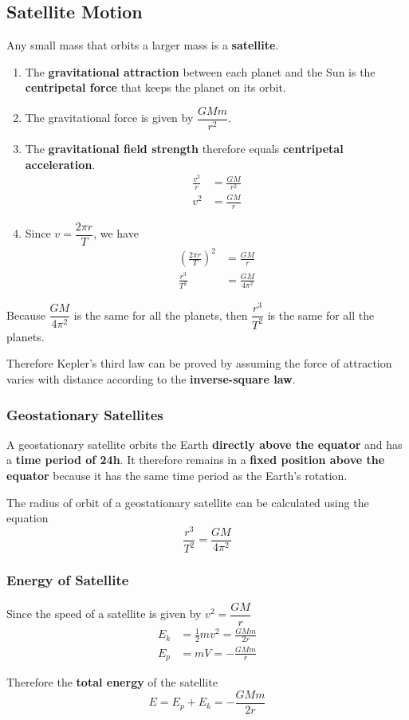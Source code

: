 \subsection{Satellite Motion}

Any small mass that orbits a larger mass is a \textbf{satellite}.

\begin{enumerate}
    \item The \textbf{gravitational attraction} between each planet and the Sun is the \textbf{centripetal force} that keeps the planet on its orbit.
    \item The gravitational force is given by $\dfrac{GMm}{r^2}$.
    \item The \textbf{gravitational field strength} therefore equals \textbf{centripetal acceleration}.
        \begin{align*}
            \frac{v^2}{r}&=\frac{GM}{r^2}\\
            v^2&=\frac{GM}{r}
        \end{align*}
    \item Since $v=\dfrac{2\pi r}{T}$, we have
        \begin{align*}
            \left(\frac{2\pi r}{T}\right)^2&=\frac{GM}{r}\\
            \frac{r^3}{T^2}&=\frac{GM}{4\pi^2}
        \end{align*}
\end{enumerate}
Because $\dfrac{GM}{4\pi^2}$ is the same for all the planets, then $\dfrac{r^3}{T^2}$ is the same for all the planets.

Therefore Kepler's third law can be proved by assuming the force of attraction varies with distance according to the \textbf{inverse-square law}.

\subsubsection*{Geostationary Satellites}

A geostationary satellite orbits the Earth \textbf{directly above the equator} and has a \textbf{time period of 24h}. It therefore remains in a \textbf{fixed position above the equator} because it has the same time period as the Earth's rotation.

The radius of orbit of a geostationary satellite can be calculated using the equation
$$\frac{r^3}{T^2}=\frac{GM}{4\pi^2}$$

\subsubsection*{Energy of Satellite}

Since the speed of a satellite is given by $v^2=\dfrac{GM}{r}$
\begin{align*}
    E_k&=\frac{1}{2}mv^2=\frac{GMm}{2r}\\
    E_p&=mV=-\frac{GMm}{r}
\end{align*}

Therefore the \textbf{total energy} of the satellite
$$E=E_p+E_k=-\frac{GMm}{2r}$$
